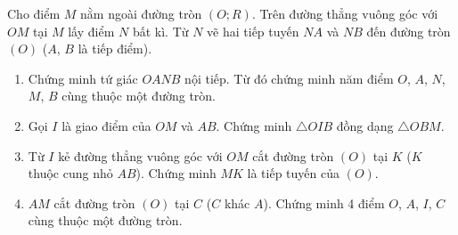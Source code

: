 \begin{ex}%
	Cho điểm $M$ nằm ngoài đường tròn $\left (O;R\right ).$ Trên đường thẳng vuông góc với $OM$ tại $M$ lấy điểm $N$ bất kì. Từ $N$ vẽ hai tiếp tuyến $NA$ và $NB$ đến đường tròn $\left (O\right )$ ($A$, $B$ là tiếp điểm).
\begin{enumerate}
\item Chứng minh tứ giác $OANB$ nội tiếp. Từ đó chứng minh năm điểm $O$, $A$, $N$, $M$, $B$ cùng thuộc một đường tròn.
\item Gọi $I$ là giao điểm của $OM$ và $AB$. Chứng minh $\triangle OIB$ đồng dạng $\triangle OBM$.
\item Từ $I$ kẻ đường thẳng vuông góc với $OM$ cắt đường tròn $\left (O\right )$ tại $K$ ($K$ thuộc cung nhỏ $AB$). Chứng minh $MK$ là tiếp tuyến của $\left (O\right ).$
\item $AM$ cắt đường tròn $\left (O\right )$ tại $C$ ($C$ khác $A$). Chứng minh 4 điểm $O$, $A$, $I$, $C$ cùng thuộc một đường tròn.
\end{enumerate}
\end{ex}
